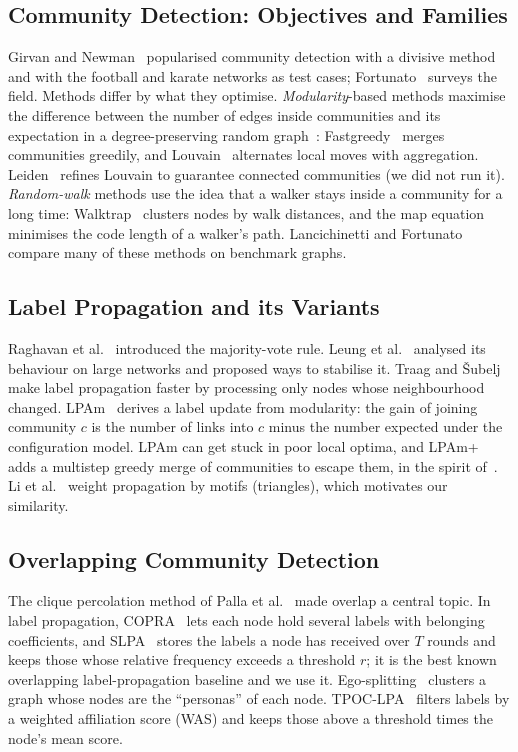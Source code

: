 \documentclass[conference]{IEEEtran}
\begin{document}
\subsection{Community Detection: Objectives and Families}
Girvan and Newman~\cite{girvan2002} popularised community detection with a divisive method and with the football and karate networks as test cases; Fortunato~\cite{fortunato2010} surveys the field. Methods differ by what they optimise. \emph{Modularity}-based methods maximise the difference between the number of edges inside communities and its expectation in a degree-preserving random graph~\cite{newman2004}: Fastgreedy~\cite{clauset2004} merges communities greedily, and Louvain~\cite{blondel2008} alternates local moves with aggregation. Leiden~\cite{traag2019} refines Louvain to guarantee connected communities (we did not run it). \emph{Random-walk} methods use the idea that a walker stays inside a community for a long time: Walktrap~\cite{pons2006} clusters nodes by walk distances, and the map equation~\cite{rosvall2008} minimises the code length of a walker's path. Lancichinetti and Fortunato~\cite{lancichinetti2009cmp} compare many of these methods on benchmark graphs.

\subsection{Label Propagation and its Variants}
Raghavan et al.~\cite{raghavan2007} introduced the majority-vote rule. Leung et al.~\cite{leung2009} analysed its behaviour on large networks and proposed ways to stabilise it. Traag and \v{S}ubelj~\cite{traag2023} make label propagation faster by processing only nodes whose neighbourhood changed. LPAm~\cite{barber2009} derives a label update from modularity: the gain of joining community $c$ is the number of links into $c$ minus the number expected under the configuration model. LPAm can get stuck in poor local optima, and LPAm+~\cite{liu2010} adds a multistep greedy merge of communities to escape them, in the spirit of~\cite{clauset2004}. Li et al.~\cite{li2020motif} weight propagation by motifs (triangles), which motivates our similarity.

\subsection{Overlapping Community Detection}
The clique percolation method of Palla et al.~\cite{palla2005} made overlap a central topic. In label propagation, COPRA~\cite{gregory2010} lets each node hold several labels with belonging coefficients, and SLPA~\cite{xie2011} stores the labels a node has received over $T$ rounds and keeps those whose relative frequency exceeds a threshold $r$; it is the best known overlapping label-propagation baseline and we use it. Ego-splitting~\cite{epasto2017} clusters a graph whose nodes are the ``personas'' of each node. TPOC-LPA~\cite{kong2026} filters labels by a weighted affiliation score (WAS) and keeps those above a threshold times the node's mean score.
\end{document}
